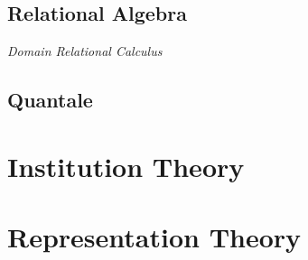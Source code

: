 \subsection{Relational Algebra}
\emph{Domain Relational Calculus}
\subsection{Quantale}

\section{Institution Theory}\label{subsec:institution_theory}
\section{Representation Theory}
